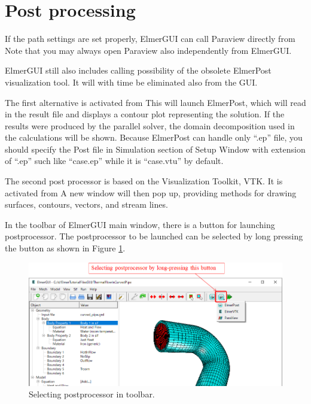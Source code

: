 \section{Post processing}

If the path settings are set properly, ElmerGUI can call Paraview directly from
Note that you may always open Paraview also independently from ElmerGUI. 

ElmerGUI still also includes calling possibility of the obsolete ElmerPost visualization tool.
It will with time be eliminated also from the GUI. 



The first alternative is activated from
\noindent This will launch ElmerPost, which will read in the result file and displays a contour plot representing the solution. If the results were produced by the parallel solver, the domain decomposition used in the calculations will be shown. Because ElmerPost can handle only ``.ep'' file, you should specify the Post file in Simulation section of Setup Window with extension of ``.ep'' such like ``case.ep'' while it is ``case.vtu'' by default.

The second post processor is based on the Visualization Toolkit, VTK. It is activated from
\noindent A new window will then pop up, providing methods for drawing surfaces, contours,
vectors, and stream lines.

In the toolbar of ElmerGUI main window, there is a button for launching postprocessor. The postprocessor to be launched can be selected by long pressing the button as shown in Figure \ref{fig:postprocessors}.  
\begin{figure}[htb]
	\begin{center}
		\includegraphics[scale=0.5]{images/postprocessors.png}
		\caption{Selecting postprocessor in toolbar.}
		\label{fig:postprocessors}
	\end{center}
\end{figure}

